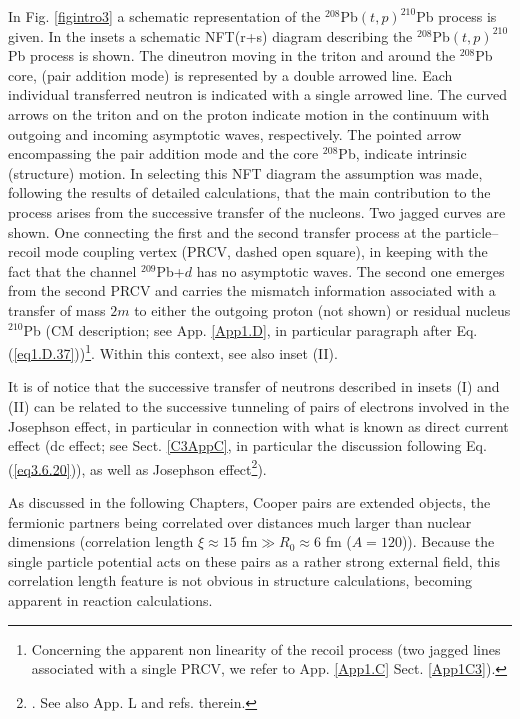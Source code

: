 In Fig. \ref{figintro3} a schematic representation of the $^{208}$Pb$(t,p)^{210}$Pb process is given. In the insets  a schematic NFT(r+s) diagram describing the $^{208}$Pb$(t,p)^{210}$Pb process is shown. The dineutron  moving in the triton and around the $^{208}$Pb core, (pair addition mode) is represented by a double arrowed line. Each individual transferred neutron is indicated with a single arrowed line. The curved arrows on the triton and on the proton indicate motion in the continuum with outgoing and incoming asymptotic waves, respectively. The pointed arrow encompassing the pair addition mode and the core $^{208}$Pb, indicate intrinsic (structure) motion. In selecting this NFT diagram  the assumption was made, following the results of detailed calculations, that the main contribution to the process arises from the successive transfer of the nucleons. Two jagged curves are shown. One connecting the first and the second transfer process at the particle--recoil mode coupling vertex (PRCV, dashed open square), in keeping with the fact that the channel $^{209}$Pb+$d$ has no asymptotic waves. The second one emerges from the second PRCV and carries the mismatch information associated with a transfer of mass $2m$ to either the outgoing proton (not shown) or residual nucleus $^{210}$Pb (CM description; see App. \ref{App1.D}, in particular paragraph after Eq. (\ref{eq1.D.37}))\footnote{Concerning the apparent non linearity of the recoil process (two jagged lines associated with a single PRCV, we refer to App. \ref{App1.C} Sect. \ref{App1C3}).}. Within this context, see also inset (II). 

 It is of notice that the successive transfer of neutrons described in insets (I) and (II) can be related to the successive tunneling of pairs of electrons involved in the Josephson effect, in particular in connection with what is known as direct current effect (dc effect; see Sect. \ref{C3AppC}, in particular the discussion following Eq. (\ref{eq3.6.20})), as well as  Josephson effect\footnote{ \cite{Josephson:62,Anderson:64b}. See also \cite{Brink:05} App. L and refs. therein.}). 


As discussed in the following Chapters, Cooper pairs are extended objects, the fermionic partners being correlated over distances much larger than nuclear dimensions (correlation length $\xi\approx15$ fm$\gg R_0\approx 6$ fm ($A=120$)). Because the single particle potential acts on these pairs as a rather strong external field, this correlation length feature is not obvious in structure calculations, becoming apparent in reaction calculations. 


